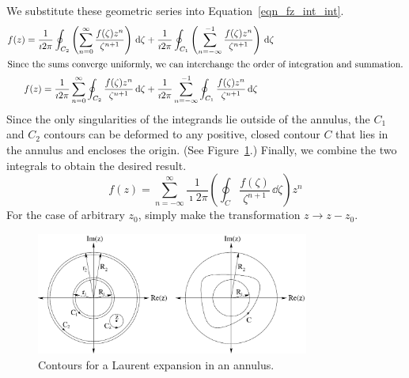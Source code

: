 We substitute these geometric series into Equation~\ref{eqn_fz_int_int}.
\begin{gather*}
  f(z) = \frac{1}{\imath 2 \pi} \oint_{C_2} \left( \sum_{n = 0}^\infty 
    \frac{ f(\zeta) z^n }{ \zeta^{n+1} } \right)\,\mathrm{d} \zeta 
  + \frac{1}{\imath 2 \pi} \oint_{C_1} \left( \sum_{n = -\infty}^{-1} 
    \frac{ f(\zeta) z^n }{ \zeta^{n+1} } \right)\,\mathrm{d} \zeta 
  \\
  \intertext{Since the sums converge uniformly, we can interchange the
    order of integration and summation.}
  f(z) = \frac{1}{\imath 2 \pi} \sum_{n = 0}^\infty \oint_{C_2} \frac{ f(\zeta) z^n }{ \zeta^{n+1} }\,\mathrm{d} \zeta 
  + \frac{1}{\imath 2 \pi} \sum_{n = -\infty}^{-1} \oint_{C_1} \frac{ f(\zeta) z^n }{ \zeta^{n+1} }\,\mathrm{d} \zeta 
\end{gather*}
Since the only singularities of the integrands lie outside of the annulus,
the $C_1$ and $C_2$ contours can be deformed to any positive, closed 
contour $C$ that lies in the annulus and encloses the origin.
(See Figure~\ref{laur_cont}.) 
Finally, we combine the two integrals to obtain the desired result.
\[
f(z) = \sum_{n = -\infty}^\infty \frac{1}{\imath 2 \pi} \left( \oint_{C} \frac{ f(\zeta) }{ \zeta^{n+1} }\,\dd \zeta 
\right) z^n
\]
For the case of arbitrary $z_0$, simply make the transformation
$z \to z - z_0$.

\begin{figure}[htb!]
  \begin{center}
    \includegraphics[width=0.8\textwidth]{fcv/series/laur_cont}
  \end{center}
  \caption{Contours for a Laurent expansion in an annulus.}
  \label{laur_cont}
\end{figure}












